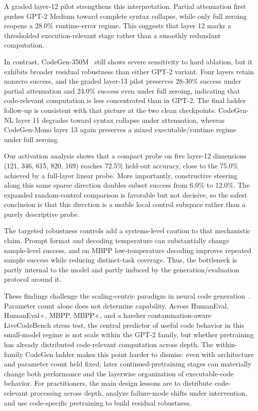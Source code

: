 \documentclass[preprint,12pt,authoryear]{elsarticle}
\begin{document}
A graded layer-12 pilot strengthens this interpretation. Partial attenuation first pushes GPT-2 Medium toward complete syntax collapse, while only full zeroing reopens a 28.0\% runtime-error regime. This suggests that layer 12 marks a thresholded execution-relevant stage rather than a smoothly redundant computation.

In contrast, CodeGen-350M~\cite{nijkamp2022codegen} still shows severe sensitivity to hard ablation, but it exhibits broader residual robustness than either GPT-2 variant. Four layers retain nonzero success, and the graded layer-13 pilot preserves 28-30\% success under partial attenuation and 24.0\% success even under full zeroing, indicating that code-relevant computation is less concentrated than in GPT-2. The final ladder follow-up is consistent with that picture at the two clean checkpoints: CodeGen-NL layer 11 degrades toward syntax collapse under attenuation, whereas CodeGen-Mono layer 13 again preserves a mixed executable/runtime regime under full zeroing.

Our activation analysis shows that a compact probe on five layer-12 dimensions (121, 346, 615, 820, 169) reaches 72.5\% held-out accuracy, close to the 75.0\% achieved by a full-layer linear probe. More importantly, constructive steering along this same sparse direction doubles subset success from 6.0\% to 12.0\%. The expanded random-control comparison is favorable but not decisive, so the safest conclusion is that this direction is a usable local control subspace rather than a purely descriptive probe.

The targeted robustness controls add a systems-level caution to that mechanistic claim. Prompt format and decoding temperature can substantially change sample-level success, and on MBPP low-temperature decoding improves repeated sample success while reducing distinct-task coverage. Thus, the bottleneck is partly internal to the model and partly induced by the generation/evaluation protocol around it.

These findings challenge the scaling-centric paradigm in neural code generation~\cite{kaplan2020scaling,wei2022emergent}. Parameter count alone does not determine capability. Across HumanEval, HumanEval+, MBPP, MBPP+, and a harsher contamination-aware LiveCodeBench stress test, the central predictor of useful code behavior in this small-model regime is not scale within the GPT-2 family, but whether pretraining has already distributed code-relevant computation across depth. The within-family CodeGen ladder makes this point harder to dismiss: even with architecture and parameter count held fixed, later continued-pretraining stages can materially change both performance and the layerwise organization of executable-code behavior. For practitioners, the main design lessons are to distribute code-relevant processing across depth, analyze failure-mode shifts under intervention, and use code-specific pretraining to build residual robustness.
\end{document}
